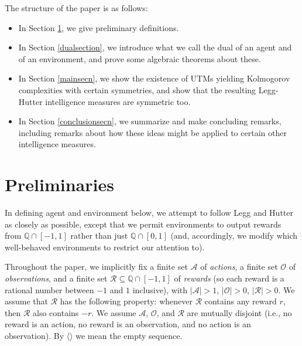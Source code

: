 \documentclass{article}
\begin{document}

The structure of the paper is as follows:
\begin{itemize}
    \item In Section \ref{prelimsecn}, we give preliminary definitions.
    \item In Section \ref{dualsection}, we introduce what we call the dual of an agent and of
        an environment, and prove some algebraic theorems about these.
    \item In Section \ref{mainsecn}, we show the existence of UTMs yielding Kolmogorov
        complexities with certain symmetries, and show that the resulting Legg-Hutter
        intelligence measures are symmetric too.
    \item In Section \ref{conclusionsecn}, we summarize and make concluding remarks, including
        remarks about how these ideas might be applied to certain other intelligence measures.
\end{itemize}

\section{Preliminaries}
\label{prelimsecn}

In defining agent and environment below, we attempt to follow
Legg and Hutter \cite{legg2007universal} as closely as possible,
except that we permit environments to output rewards from $\mathbb Q \cap [-1,1]$
rather than just $\mathbb Q\cap [0,1]$ (and, accordingly, we modify which well-behaved
environments to restrict our attention to).

Throughout the paper, we implicitly
fix a finite set $\mathcal A$ of \emph{actions},
a finite set $\mathcal O$ of \emph{observations},
and a finite set $\mathcal R\subseteq \mathbb Q\cap [-1,1]$ of \emph{rewards}
(so each reward is a rational number between $-1$ and $1$ inclusive),
with $|\mathcal A|>1$,
$|\mathcal O|>0$, $|\mathcal R|>0$.
We assume that $\mathcal R$ has the following property:
whenever $\mathcal R$ contains any reward $r$, then $\mathcal R$
also contains $-r$.
We assume $\mathcal A$, $\mathcal O$, and $\mathcal R$ are mutually disjoint
(i.e., no reward is an action, no reward is an observation, and no action is an
observation).
By $\langle\rangle$ we mean the empty sequence.
\end{document}
